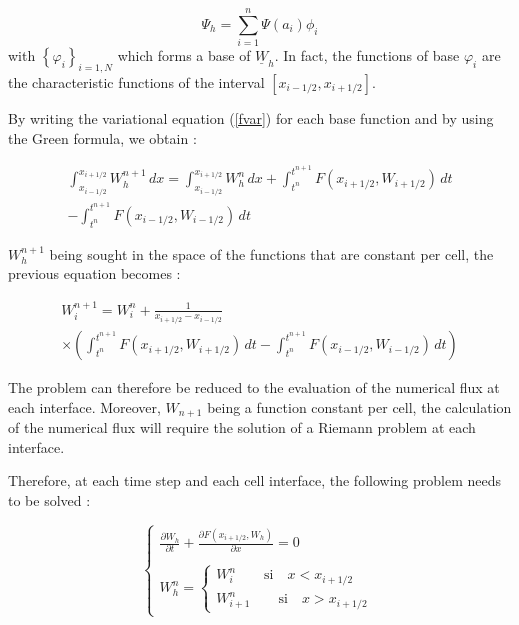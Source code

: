 \begin{equation}
 \Psi_h = \sum_{i=1}^n \Psi (a_i)\phi_i
\end{equation}
with $\left \lbrace \varphi_i\right \rbrace_{i=1,N}$ which forms a base of $\underline{W}_h$. In fact, the functions of base $\varphi_i$ are the characteristic functions of the interval $[x_{i-1/2},x_{i+1/2}]$.

By writing the variational equation (\ref{fvar}) for each base function and by using the Green formula, we obtain :

\begin{eqnarray}
 & \int_{x_{i-1/2}}^{x_{i+1/2}} W_{h}^{n+1}\, dx = \int_{x_{i-1/2}}^{x_{i+1/2}} W_{h}^{n}\, dx + \int_{t^n}^{t^{n+1}} F(x_{i+1/2},W_{i+1/2}) \, dt  &         \nonumber \\
 & - \int_{t^n}^{t^{n+1}} F(x_{i-1/2},W_{i-1/2}) \, dt &
\end{eqnarray}

$W_{h}^{n+1}$ being sought in the space of the functions that are constant per cell, the previous equation becomes :

\begin{eqnarray}
 & W_{i}^{n+1} = W_{i}^n + \frac{1}{x_{i+1/2}-x_{i-1/2}} & \nonumber \\
 & \times \left ( \int_{t^n}^{t^{n+1}} F(x_{i+1/2},W_{i+1/2}) \, dt - \int_{t^n}^{t^{n+1}} F(x_{i-1/2},W_{i-1/2}) \, dt \right ) &
\end{eqnarray}

The problem can therefore be reduced to the evaluation of the numerical flux at each interface. Moreover, $W_{n+1}$ being a function constant per cell, the calculation of the numerical flux will require the solution of a Riemann problem at each interface.

Therefore, at each time step and each cell interface, the following problem needs to be solved :

\begin{equation}
 \label{sysW}
 \left \lbrace
  \begin{array}{l}
   \frac{\partial W_h}{\partial t} + \frac{\partial F(x_{i+1/2},W_h)}{\partial x} = 0 \\
   \\
   W_{h}^n = \left \lbrace
             \begin{array}{l}
               W_{i}^n \qquad \mbox{si} \quad x < x_{i+1/2} \\
               W_{i+1}^n \qquad \mbox{si} \quad x > x_{i+1/2}
             \end{array}
             \right.
  \end{array}
 \right.
\end{equation}

